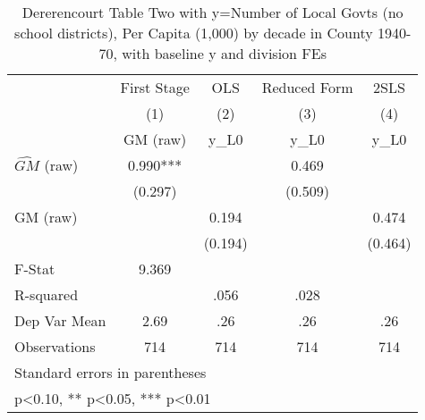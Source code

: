 \begin{table}[htbp]\centering
\def\sym#1{\ifmmode^{#1}\else\(^{#1}\)\fi}
\caption{Dererencourt Table Two with y=Number of Local Govts (no school districts), Per Capita (1,000) by decade in County 1940-70, with baseline y and division FEs}
\begin{tabular}{l*{4}{c}}
\toprule
                    & First Stage   &         OLS   &Reduced Form   &        2SLS   \\
                    &\multicolumn{1}{c}{(1)}&\multicolumn{1}{c}{(2)}&\multicolumn{1}{c}{(3)}&\multicolumn{1}{c}{(4)}\\
                    &\multicolumn{1}{c}{GM  (raw)}&\multicolumn{1}{c}{y\_L0}&\multicolumn{1}{c}{y\_L0}&\multicolumn{1}{c}{y\_L0}\\
\midrule
$\hat{GM}$ (raw)    &       0.990***&               &       0.469   &               \\
                    &     (0.297)   &               &     (0.509)   &               \\
\addlinespace
GM  (raw)           &               &       0.194   &               &       0.474   \\
                    &               &     (0.194)   &               &     (0.464)   \\
\midrule
F-Stat              &       9.369   &               &               &               \\
R-squared           &               &        .056   &        .028   &               \\
Dep Var Mean        &        2.69   &         .26   &         .26   &         .26   \\
Observations        &         714   &         714   &         714   &         714   \\
\bottomrule
\multicolumn{5}{l}{\footnotesize Standard errors in parentheses}\\
\multicolumn{5}{l}{\footnotesize * p<0.10, ** p<0.05, *** p<0.01}\\
\end{tabular}
\end{table}
